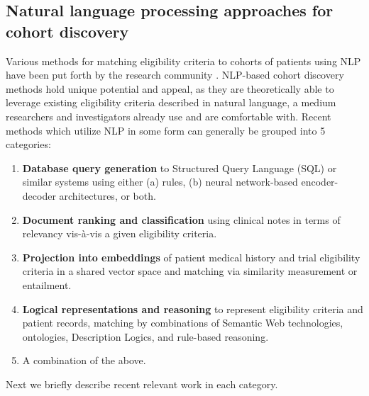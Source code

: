\documentclass[../main.tex]{subfiles}
\begin{document}
\subsection{Natural language processing approaches for cohort discovery}

Various methods for matching eligibility criteria to cohorts of patients using NLP have been put forth by the research community \cite{yuan2019criteria2query, soni2020patient, fang2022combining, zhang2020deepenroll, chen2019clinical, patrao2015recruit, dhayne2021emr2vec, liu2021evaluating, xiong2019cohort}. NLP-based cohort discovery methods hold unique potential and appeal, as they are theoretically able to leverage existing eligibility criteria described in natural language, a medium researchers and investigators already use and are comfortable with. Recent methods which utilize NLP in some form can generally be grouped into 5 categories:

\begin{enumerate}
    \item{\textbf{Database query generation} to Structured Query Language (SQL) or similar systems using either (a) rules, (b) neural network-based encoder-decoder architectures}, or both.
    \item{\textbf{Document ranking and classification} using clinical notes in terms of relevancy vis-à-vis a given eligibility criteria.}
    \item{\textbf{Projection into embeddings} of patient medical history and trial eligibility criteria in a shared vector space and matching via similarity measurement or entailment.}
    \item{\textbf{Logical representations and reasoning} to represent eligibility criteria and patient records, matching by combinations of Semantic Web technologies, ontologies, Description Logics, and rule-based reasoning.}
    \item{A combination of the above.}
\end{enumerate}

\noindent Next we briefly describe recent relevant work in each category. \\
\end{document}
